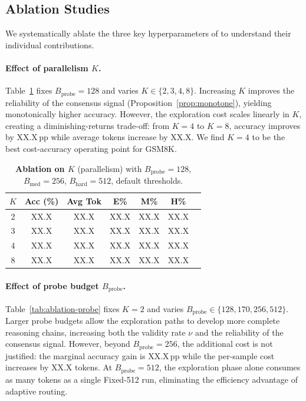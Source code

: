 \subsection{Ablation Studies}
\label{sec:exp:ablation}

We systematically ablate the three key hyperparameters of \method{} to
understand their individual contributions.

\paragraph{Effect of parallelism $K$.}
Table~\ref{tab:ablation-k} fixes $B_{\mathrm{probe}} = 128$ and varies
$K \in \{2, 3, 4, 8\}$.
Increasing $K$ improves the reliability of the consensus signal
(Proposition~\ref{prop:monotone}), yielding monotonically higher accuracy.
However, the exploration cost scales linearly in $K$, creating a
diminishing-returns trade-off: from $K = 4$ to $K = 8$, accuracy improves
by XX.X\,pp while average tokens increase by XX.X.
We find $K = 4$ to be the best cost-accuracy operating point for GSM8K.

\begin{table}[t]
\centering
\caption{%
  \textbf{Ablation on $K$} (parallelism) with $B_{\mathrm{probe}} = 128$,
  $B_{\mathrm{med}} = 256$, $B_{\mathrm{hard}} = 512$, default thresholds.
}
\label{tab:ablation-k}
\small
\begin{tabular}{@{}ccccccc@{}}
\toprule
$K$ & \textbf{Acc (\%)} & \textbf{Avg Tok} &
  \textbf{E\%} & \textbf{M\%} & \textbf{H\%} \\
\midrule
2 & XX.X & XX.X & XX.X & XX.X & XX.X \\
3 & XX.X & XX.X & XX.X & XX.X & XX.X \\
4 & XX.X & XX.X & XX.X & XX.X & XX.X \\
8 & XX.X & XX.X & XX.X & XX.X & XX.X \\
\bottomrule
\end{tabular}
\end{table}

\paragraph{Effect of probe budget $B_{\mathrm{probe}}$.}
Table~\ref{tab:ablation-probe} fixes $K = 2$ and varies
$B_{\mathrm{probe}} \in \{128, 170, 256, 512\}$.
Larger probe budgets allow the exploration paths to develop more
complete reasoning chains, increasing both the validity rate $\nu$ and
the reliability of the consensus signal.
However, beyond $B_{\mathrm{probe}} = 256$, the additional cost is not
justified: the marginal accuracy gain is XX.X\,pp while the per-sample
cost increases by XX.X tokens.
At $B_{\mathrm{probe}} = 512$, the exploration phase alone consumes as
many tokens as a single Fixed-512 run, eliminating the efficiency
advantage of adaptive routing.

